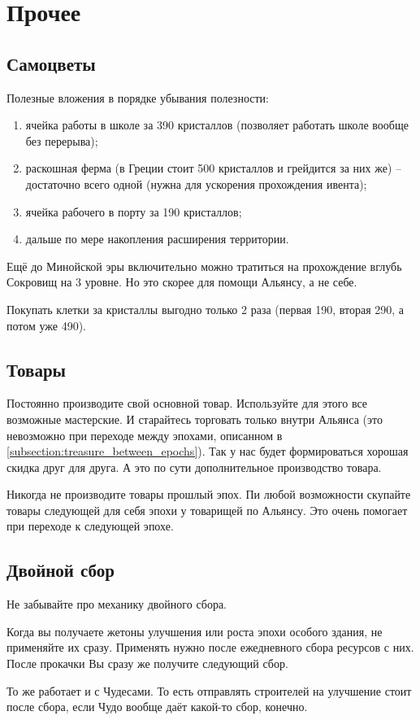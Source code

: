 \section{Прочее}

\subsection{Самоцветы}

Полезные вложения в порядке убывания полезности:
\begin{enumerate}
    \item ячейка работы в школе за 390 кристаллов (позволяет работать школе вообще без перерыва);    
    \item раскошная ферма (в Греции стоит 500 кристаллов и грейдится за них же) -- достаточно всего одной (нужна для ускорения прохождения ивента);
    \item ячейка рабочего в порту за 190 кристаллов;
    \item дальше по мере накопления расширения территории.
\end{enumerate}
Ещё до Минойской эры включительно можно тратиться на прохождение вглубь Сокровищ на 3 уровне. Но это скорее для помощи Альянсу, а не себе. 

Покупать клетки за кристаллы выгодно только 2 раза (первая 190, вторая 290, а потом уже 490).

\subsection{Товары}

Постоянно производите свой основной товар.
Используйте для этого все возможные мастерские.
И старайтесь торговать только внутри Альянса (это невозможно при переходе между эпохами, описанном в \ref{subsection:treasure_between_epochs}).
Так у нас будет формироваться хорошая скидка друг для друга.
А это по сути дополнительное производство товара.

Никогда не производите товары прошлый эпох.
Пи любой возможности скупайте товары следующей для себя эпохи у товарищей по Альянсу.
Это очень помогает при переходе к следующей эпохе.

\subsection{Двойной сбор}

Не забывайте про механику двойного сбора.

Когда вы получаете жетоны улучшения или роста эпохи особого здания, не применяйте их сразу.
Применять нужно после ежедневного сбора ресурсов с них.
После прокачки Вы сразу же получите следующий сбор.

То же работает и с Чудесами. 
То есть отправлять строителей на улучшение стоит после сбора, если Чудо вообще даёт какой-то сбор, конечно.
